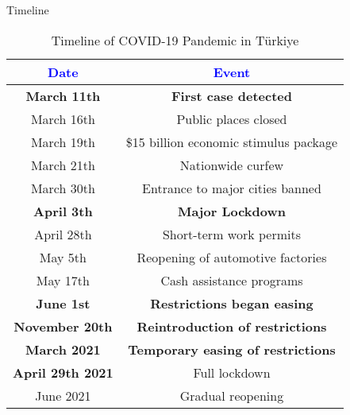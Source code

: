\documentclass[
	11pt, %
]{beamer}
\begin{document}
\begin{frame}{Timeline}
    \scriptsize 
    \begin{table}
        \centering
        \begin{tabular}{|c|c|}
            \hline
            \textcolor{blue}{Date}   & \textcolor{blue}{Event} \\ \hline
            \textbf{March 11th}    &  \textbf{First case detected} \\ \hline
            March 16th    & Public places closed \\ \hline
            March 19th    & \$15 billion economic stimulus package \\ \hline
            March 21th    & Nationwide curfew \\ \hline
            March 30th    & Entrance to major cities banned \\ \hline
            \textbf{April 3th} & \textbf{Major Lockdown} \\ \hline
            April 28th   & Short-term work permits \\ \hline
            May 5th    & Reopening of automotive factories \\ \hline
            May 17th    & Cash assistance programs \\ \hline
            \textbf{June 1st}   & \textbf{Restrictions began easing} \\ \hline
            \textbf{November 20th} & \textbf{Reintroduction of restrictions} \\ \hline
            \textbf{March 2021} & \textbf{Temporary easing of restrictions} \\ \hline
            \textbf{April 29th 2021 }   & Full lockdown \\ \hline
            June 2021    & Gradual reopening \\ \hline
        \end{tabular}
        \caption{Timeline of COVID-19 Pandemic in Türkiye}
    \end{table}
\end{frame}
\end{document}
